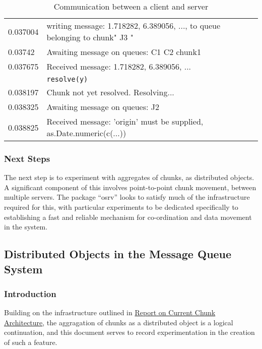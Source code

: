 \begin{table}
\begin{tabularx}{\textwidth}{lX}
		0.037004 & \textcolor{\servercolour}{writing message: 1.718282, 6.389056, ..., to queue belonging to chunk" J3 "} \\
		0.03742  & \textcolor{\servercolour}{Awaiting message on queues: C1     C2     chunk1} \\
		0.037675 & \textcolor{\clientcolour}{Received message: 1.718282, 6.389056, ... } \\
			 & \textcolor{\clientcolour}{\texttt{resolve(y)}} \\
		0.038197 & \textcolor{\clientcolour}{Chunk not yet resolved. Resolving...} \\
		0.038325 & \textcolor{\clientcolour}{Awaiting message on queues: J2} \\
		0.038825 & \textcolor{\clientcolour}{Received message: 'origin' must be supplied, as.Date.numeric(c(...))} \\
		\bottomrule
	\end{tabularx}
	\caption{Communication between a client and server}
	\label{tab:chunk-comm}
\end{table}

\subsubsection{Next Steps}

The next step is to experiment with aggregates of chunks, as distributed objects.
A significant component of this involves point-to-point chunk movement, between multiple servers.
The package ``osrv'' looks to satisfy much of the infrastructure required for
this, with particular experiments to be dedicated specifically to establishing
a fast and reliable mechanism for co-ordination and data movement in the system.

\subsection{Distributed Objects in the Message Queue System}

\subsubsection{Introduction}

Building on the infrastructure outlined in \href{chunk-report.pdf}{Report on
Current Chunk Architecture}, the aggragation of chunks as a distributed object
is a logical continuation, and this document serves to record experimentation
in the creation of such a feature.

